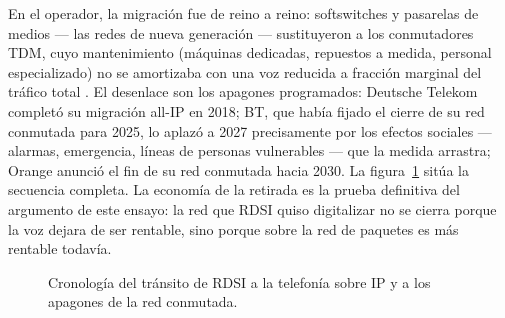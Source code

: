 \documentclass[12pt,a4paper]{article}
\begin{document}
En el operador, la migración fue de reino a reino: softswitches y pasarelas de medios --- las redes de nueva generación --- sustituyeron a los conmutadores TDM, cuyo mantenimiento (máquinas dedicadas, repuestos a medida, personal especializado) no se amortizaba con una voz reducida a fracción marginal del tráfico total \cite{werbach2014}. El desenlace son los apagones programados: Deutsche Telekom completó su migración all-IP en 2018; BT, que había fijado el cierre de su red conmutada para 2025, lo aplazó a 2027 precisamente por los efectos sociales --- alarmas, emergencia, líneas de personas vulnerables --- que la medida arrastra; Orange anunció el fin de su red conmutada hacia 2030. La figura~\ref{fig:cronologia} sitúa la secuencia completa. La economía de la retirada es la prueba definitiva del argumento de este ensayo: la red que RDSI quiso digitalizar no se cierra porque la voz dejara de ser rentable, sino porque sobre la red de paquetes es más rentable todavía.

\begin{figure}[h]
    \centering
    \caption{Cronología del tránsito de RDSI a la telefonía sobre IP y a los apagones de la red conmutada.}
    \label{fig:cronologia}
\end{figure}
\end{document}
